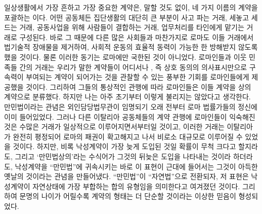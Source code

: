 일상생활에서
가장 흔하고 가장 중요한 계약은, 말할 것도 없이,
네 가지 이름의 계약을 포괄하는 이다.
어떤 공동체든 집단생활의 대단히 큰 부분이
사고 파는 거래, 세놓고 세드는 거래,
공동사업을 위해 사람들이 결합하는 거래,
업무처리를 타인에게 맡기는 거래로 구성된다.
바로 그 때문에
다른 많은 사회들과 마찬가지로 로마도
이들 거래에서 법기술적 장애물을 제거하여,
사회적 운동의 효율적 동력이
가능한 한
방해받지 않도록 했을 것이다.
물론 이러한 동기는 로마에만 국한된 것이 아니었다.
로마인들과 이웃 민족들 간의 거래는
우리가 말한 계약들이 어디서나 ,
즉 상호 동의의 의사표시만으로 구속력이 부여되는 계약이
되어가는 것을 관찰할 수 있는
풍부한 기회를
로마인들에게
제공했을 것이다.
그리하여 그들의 통상적인 관행에 따라
로마인들은 이들 계약을
상의 계약으로 분류했다.
하지만 나는
아주 초기부터 이렇게 불리지는 않았다고 생각한다.
만민법이라는 관념은
외인담당법무관이 임명되기 오래 전부터
로마 법률가들의 정신에 이미 들어있었다.
그러나 다른 이탈리아 공동체들의 계약 관행에 로마인들이 익숙해진 것은
수많은 거래가 일상적으로 이루어지면서부터일 것이고,
이러한 거래는 이탈리아가 완전히 평정되어
로마의 패권이 확고해지고 나서
비로소 대규모로 이루어질 수 있었을 것이다.
하지만, 비록
낙성계약이 가장 늦게 도입된 것일 확률이 무척 크다고 할지라도,
그리고
`만민법상의'라는 수식어가 그것의 뒤늦은 도입을
나타내는 것이라 하더라도,
낙성계약을 ``만민법''에 귀속시키는
바로 이 표현이 근대에 들어서는
그것이 아득한 옛날의 것이라는 관념을 만들어냈다.
``만민법''이
``자연법''으로
전환되자,
저 표현은
낙성계약이 자연상태에 가장 부합하는 합의 유형임을
의미한다고 여겨졌던 것이다.
그리하여 문명의 나이가 어릴수록
계약의 형태는 더 단순할 것이라는 이상한 믿음이 형성되었다.

